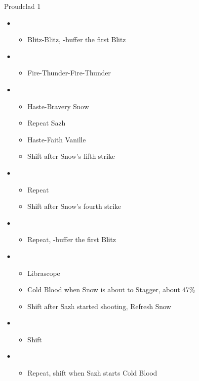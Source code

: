 \documentclass{report}
\begin{document}
\begin{battle}{Proudclad 1}
\begin{itemize}
    \item \second
    \begin{itemize}
        \item Blitz-Blitz, \rav-buffer the first Blitz
    \end{itemize}
    \item \sixth
    \begin{itemize}
        \item Fire-Thunder-Fire-Thunder
    \end{itemize}
    \item \fourth
    \begin{itemize}
        \item Haste-Bravery Snow
        \item Repeat Sazh
        \item Haste-Faith Vanille
        \item Shift after Snow's fifth strike
    \end{itemize}
    \item \sixth
    \begin{itemize}
        \item Repeat
        \item Shift after Snow's fourth strike
    \end{itemize}
    \item \first
    \begin{itemize}
        \item Repeat, \rav-buffer the first Blitz
    \end{itemize}
    \item \fifth
    \begin{itemize}
        \item Librascope
        \item Cold Blood when Snow is about to Stagger, about 47\%
        \item Shift after Sazh started shooting, Refresh Snow
    \end{itemize}
    \item \sixth
    \begin{itemize}
        \item Shift
    \end{itemize}
    \item \fifth
    \begin{itemize}
        \item Repeat, shift when Sazh starts Cold Blood

\end{itemize}
\end{itemize}
\end{battle}
\end{document}

